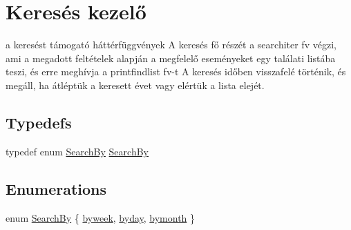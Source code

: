 \hypertarget{group__search}{}\section{Keresés kezelő}
\label{group__search}


a keresést támogató háttérfüggvények A keresés fő részét a searchiter fv végzi, ami a megadott feltételek alapján a megfelelő eseményeket egy találati listába teszi, és erre meghívja a printfindlist fv-\/t A keresés időben visszafelé történik, és megáll, ha átléptük a keresett évet vagy elértük a lista elejét.  


\subsection*{Typedefs}
\begin{DoxyCompactItemize}
\item 
typedef enum \hyperlink{group__search_gaf9df49b17c9441844cafc15064ec50fc}{Search\+By} \hyperlink{group__search_ga2ab4e565bcf990b57e010007e13bec43}{Search\+By}
\end{DoxyCompactItemize}
\subsection*{Enumerations}
\begin{DoxyCompactItemize}
\item 
enum \hyperlink{group__search_gaf9df49b17c9441844cafc15064ec50fc}{Search\+By} \{ \hyperlink{group__search_ggaf9df49b17c9441844cafc15064ec50fca22234af7e39a964f41baef92fdd17c14}{byweek}, 
\hyperlink{group__search_ggaf9df49b17c9441844cafc15064ec50fca5efad3bcd6c0ae75087b25e99c9483fa}{byday}, 
\hyperlink{group__search_ggaf9df49b17c9441844cafc15064ec50fca1079e56084842bedf75f880e98175b84}{bymonth}
 \}
\end{DoxyCompactItemize}
